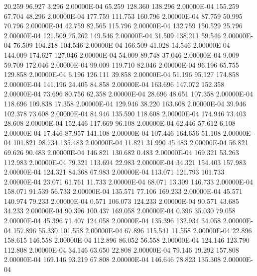     20.259    96.927     3.296  2.00000E-04
    65.259   128.360   138.296  2.00000E-04
   155.259    67.704    48.296  2.00000E-04
   177.759   111.753   160.796  2.00000E-04
    87.759    50.995    70.796  2.00000E-04
    42.759    82.565   115.796  2.00000E-04
   132.759   150.529    25.796  2.00000E-04
   121.509    75.262   149.546  2.00000E-04
    31.509   138.211    59.546  2.00000E-04
    76.509   104.218   104.546  2.00000E-04
   166.509    41.028    14.546  2.00000E-04
   144.009   174.627   127.046  2.00000E-04
    54.009    89.748    37.046  2.00000E-04
     9.009    59.709   172.046  2.00000E-04
    99.009   119.710    82.046  2.00000E-04
    96.196    65.755   129.858  2.00000E-04
     6.196   126.111    39.858  2.00000E-04
    51.196    95.127   174.858  2.00000E-04
   141.196    24.405    84.858  2.00000E-04
   163.696   147.072   152.358  2.00000E-04
    73.696    80.756    62.358  2.00000E-04
    28.696    48.651   107.358  2.00000E-04
   118.696   109.838    17.358  2.00000E-04
   129.946    38.220   163.608  2.00000E-04
    39.946   102.378    73.608  2.00000E-04
    84.946   135.590   118.608  2.00000E-04
   174.946    73.403    28.608  2.00000E-04
   152.446   117.669    96.108  2.00000E-04
    62.446    57.612     6.108  2.00000E-04
    17.446    87.957   141.108  2.00000E-04
   107.446   164.656    51.108  2.00000E-04
   101.821    98.734   135.483  2.00000E-04
    11.821    31.990    45.483  2.00000E-04
    56.821    69.626    90.483  2.00000E-04
   146.821   130.682     0.483  2.00000E-04
   169.321    53.263   112.983  2.00000E-04
    79.321   113.694    22.983  2.00000E-04
    34.321   154.403   157.983  2.00000E-04
   124.321    84.368    67.983  2.00000E-04
   113.071   121.793   101.733  2.00000E-04
    23.071    61.761    11.733  2.00000E-04
    68.071    13.309   146.733  2.00000E-04
   158.071    91.539    56.733  2.00000E-04
   135.571    77.106   169.233  2.00000E-04
    45.571   140.974    79.233  2.00000E-04
     0.571   106.073   124.233  2.00000E-04
    90.571    43.685    34.233  2.00000E-04
    90.396   100.437   169.058  2.00000E-04
     0.396    35.030    79.058  2.00000E-04
    45.396    71.407   124.058  2.00000E-04
   135.396   132.934    34.058  2.00000E-04
   157.896    55.330   101.558  2.00000E-04
    67.896   115.541    11.558  2.00000E-04
    22.896   158.615   146.558  2.00000E-04
   112.896    86.052    56.558  2.00000E-04
   124.146   123.790   112.808  2.00000E-04
    34.146    63.650    22.808  2.00000E-04
    79.146    19.292   157.808  2.00000E-04
   169.146    93.219    67.808  2.00000E-04
   146.646    78.823   135.308  2.00000E-04
